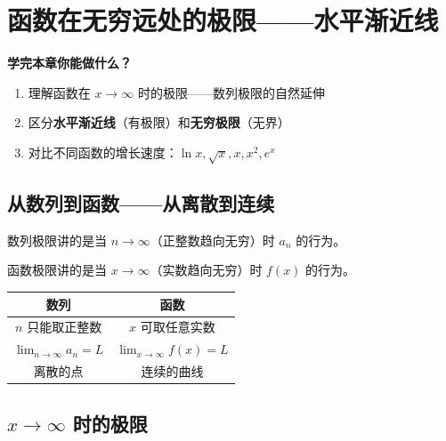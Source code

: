 
\chapter{函数在无穷远处的极限——水平渐近线}

\begin{applicationbox}
\textbf{学完本章你能做什么？}
\begin{enumerate}
  \item 理解函数在 \(x \to \infty\) 时的极限——数列极限的自然延伸
  \item 区分\textbf{水平渐近线}（有极限）和\textbf{无穷极限}（无界）
  \item 对比不同函数的增长速度：\(\ln x, \sqrt{x}, x, x^2, e^x\)
\end{enumerate}
\end{applicationbox}


\section{从数列到函数——从离散到连续}

数列极限讲的是当 \(n \to \infty\)（正整数趋向无穷）时 \(a_n\) 的行为。

函数极限讲的是当 \(x \to \infty\)（实数趋向无穷）时 \(f(x)\) 的行为。

\begin{center}
\begin{tabular}{c|c}
\textbf{数列} & \textbf{函数} \\
\hline
\(n\) 只能取正整数 & \(x\) 可取任意实数 \\
\(\displaystyle\lim_{n\to\infty} a_n = L\) & \(\displaystyle\lim_{x\to\infty} f(x) = L\) \\
离散的点 & 连续的曲线 \\
\end{tabular}
\end{center}


\section{\(x \to \infty\) 时的极限}

